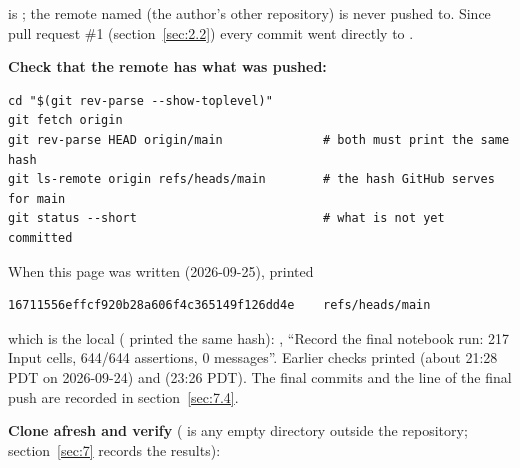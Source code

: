  is ; the remote named  (the author's other repository) is never pushed to. Since pull request \#1 (section~\ref{sec:2.2}) every commit went directly to .

\textbf{Check that the remote has what was pushed:}

\begin{Verbatim}
cd "$(git rev-parse --show-toplevel)"
git fetch origin
git rev-parse HEAD origin/main              # both must print the same hash
git ls-remote origin refs/heads/main        # the hash GitHub serves for main
git status --short                          # what is not yet committed
\end{Verbatim}

When this page was written (2026-09-25),  printed

\begin{Verbatim}
16711556effcf920b28a606f4c365149f126dd4e	refs/heads/main
\end{Verbatim}

which is the local  ( printed the same hash): , ``Record the final notebook run: 217 Input cells, 644/644 assertions, 0 messages''. Earlier checks printed  (about 21:28 PDT on 2026-09-24) and  (23:26 PDT). The final commits and the  line of the final push are recorded in section~\ref{sec:7.4}.

\textbf{Clone afresh and verify} ( is any empty directory outside the repository; section~\ref{sec:7} records the results):

